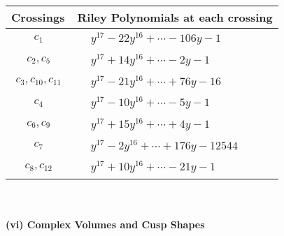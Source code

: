 \documentclass[1p]{elsarticle_modified}
\theoremstyle{definition}
\begin{document}
\begin{tabular}{m{50pt}|m{274pt}}
Crossings & \hspace{64pt}Riley Polynomials at each crossing \\
\hline $$\begin{aligned}c_{1}\end{aligned}$$&$\begin{aligned}
&y^{17}-22 y^{16}+\cdots-106 y-1
\end{aligned}$\\
\hline $$\begin{aligned}c_{2},c_{5}\end{aligned}$$&$\begin{aligned}
&y^{17}+14 y^{16}+\cdots-2 y-1
\end{aligned}$\\
\hline $$\begin{aligned}c_{3},c_{10},c_{11}\end{aligned}$$&$\begin{aligned}
&y^{17}-21 y^{16}+\cdots+76 y-16
\end{aligned}$\\
\hline $$\begin{aligned}c_{4}\end{aligned}$$&$\begin{aligned}
&y^{17}-10 y^{16}+\cdots-5 y-1
\end{aligned}$\\
\hline $$\begin{aligned}c_{6},c_{9}\end{aligned}$$&$\begin{aligned}
&y^{17}+15 y^{16}+\cdots+4 y-1
\end{aligned}$\\
\hline $$\begin{aligned}c_{7}\end{aligned}$$&$\begin{aligned}
&y^{17}-2 y^{16}+\cdots+176 y-12544
\end{aligned}$\\
\hline $$\begin{aligned}c_{8},c_{12}\end{aligned}$$&$\begin{aligned}
&y^{17}+10 y^{16}+\cdots-21 y-1
\end{aligned}$\\
\hline
\end{tabular}\\~\\
\newpage\flushleft \textbf{(vi) Complex Volumes and Cusp Shapes}
\end{document}
